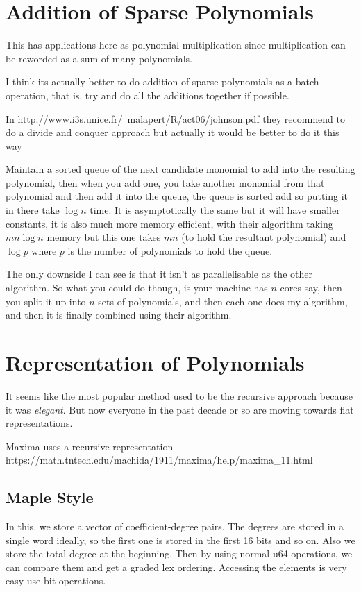 \section{Addition of Sparse Polynomials}

This has applications here as polynomial multiplication since multiplication can be reworded as a sum of many polynomials.

I think its actually better to do addition of sparse polynomials as a batch operation, that is, try and do all the additions together if possible.

In http://www.i3s.unice.fr/~malapert/R/act06/johnson.pdf they recommend to do a divide and conquer approach but actually it would be better to do it this way

Maintain a sorted queue of the next candidate monomial to add into the resulting polynomial, then when you add one, you take another monomial from that polynomial and then add it into the queue, the queue is sorted add so putting it in there take $\log n$ time. It is asymptotically the same but it will have smaller constants, it is also much more memory efficient, with their algorithm taking $mn\log n$ memory but this one takes $mn$ (to hold the resultant polynomial) and $\log p$ where $p$ is the number of polynomials to hold the queue.

The only downside I can see is that it isn't as parallelisable as the other algorithm. So what you could do though, is your machine has $n$ cores say, then you split it up into $n$ sets of polynomials, and then each one does my algorithm, and then it is finally combined using their algorithm.

\section{Representation of Polynomials}

It seems like the most popular method used to be the recursive approach because it was \emph{elegant}. But now everyone in the past decade or so are moving towards flat representations.

Maxima uses a recursive representation https://math.tntech.edu/machida/1911/maxima/help/maxima\_11.html

\subsection{Maple Style}%
\label{sub:Maple Style}

In this, we store a vector of coefficient-degree pairs. The degrees are stored in a single word ideally, so the first one is stored in the first 16 bits and so on. Also we store the total degree at the beginning. Then by using normal u64 operations, we can compare them and get a graded lex ordering. Accessing the elements is very easy use bit operations.

